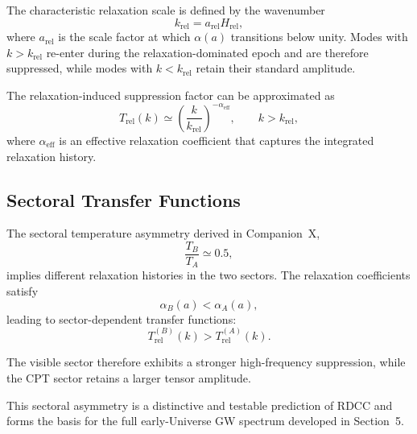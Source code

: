 \documentclass[11pt,a4paper]{article}
\begin{document}
The characteristic relaxation scale is defined by the wavenumber
\begin{equation}
k_{\mathrm{rel}} = a_{\mathrm{rel}} H_{\mathrm{rel}},
\end{equation}
where \(a_{\mathrm{rel}}\) is the scale factor at which \(\alpha(a)\) transitions below unity. Modes with
\(k > k_{\mathrm{rel}}\) re-enter during the relaxation-dominated epoch and are therefore suppressed,
while modes with \(k < k_{\mathrm{rel}}\) retain their standard amplitude.

The relaxation-induced suppression factor can be approximated as
\begin{equation}
T_{\mathrm{rel}}(k)
\simeq
\left( \frac{k}{k_{\mathrm{rel}}} \right)^{-\alpha_{\mathrm{eff}}},
\qquad
k > k_{\mathrm{rel}},
\end{equation}
where \(\alpha_{\mathrm{eff}}\) is an effective relaxation coefficient that captures the integrated
relaxation history.


\subsection{Sectoral Transfer Functions}

The sectoral temperature asymmetry derived in Companion~X,
\begin{equation}
\frac{T_{B}}{T_{A}} \simeq 0.5,
\end{equation}
implies different relaxation histories in the two sectors. The relaxation coefficients satisfy
\begin{equation}
\alpha_{B}(a) < \alpha_{A}(a),
\end{equation}
leading to sector-dependent transfer functions:
\begin{equation}
T_{\mathrm{rel}}^{(B)}(k) > T_{\mathrm{rel}}^{(A)}(k).
\end{equation}

The visible sector therefore exhibits a stronger high-frequency suppression, while the CPT
sector retains a larger tensor amplitude.

This sectoral asymmetry is a distinctive and testable prediction of RDCC and forms the basis
for the full early-Universe GW spectrum developed in Section~5.

\end{document}
